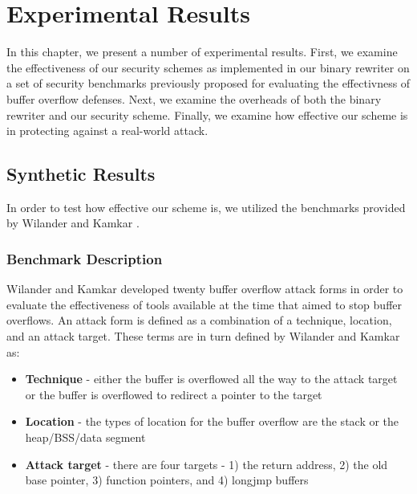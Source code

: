 
\renewcommand{\thechapter}{4}

\chapter{Experimental Results}

In this chapter, we present a number of experimental results. First, we examine the effectiveness of
our security schemes as implemented in our binary rewriter on a set of security benchmarks
previously proposed for evaluating the effectivness of buffer overflow defenses. Next, we examine
the overheads of both the binary rewriter and our security scheme. Finally, we examine how effective
our scheme is in protecting against a real-world attack.

\section{Synthetic Results}

In order to test how effective our scheme is, we utilized the benchmarks provided by Wilander and
Kamkar \cite{}.

\subsection{Benchmark Description}

Wilander and Kamkar developed twenty buffer overflow attack forms in order to evaluate the
effectiveness of tools available at the time that aimed to stop buffer overflows. An attack form is
defined as a combination of a technique, location, and an attack target. These terms are in turn
defined by Wilander and Kamkar as:

\begin{itemize}

\item \textbf{Technique} - either the buffer is overflowed all the way to the attack target
or the buffer is overflowed to redirect a pointer to the target

\item \textbf{Location} - the types of location for the buffer overflow are the stack or the
heap/BSS/data segment

\item \textbf{Attack target} - there are four targets - 1) the return address, 2) the old
base pointer, 3) function pointers, and 4) longjmp buffers

\end{itemize}

